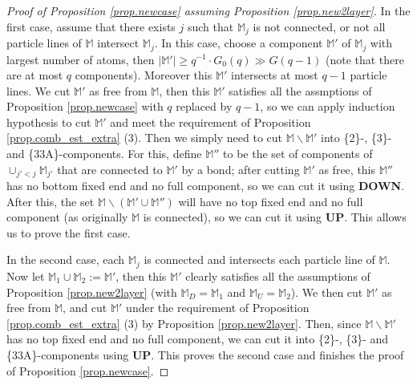 \documentclass[10pt, reqno]{amsart}
\newcommand{\Mb}{\mathbb M}
\theoremstyle{definition}
\theoremstyle{remark}
\numberwithin{equation}{section}
\begin{document}
\begin{proof}[Proof of Proposition \ref{prop.newcase} assuming Proposition \ref{prop.new2layer}]
In the first case, assume that there exists $j$ such that $\Mb_j$ is not connected, or not all particle lines of $\Mb$ intersect $\Mb_j$. In this case, choose a component $\Mb'$ of $\Mb_j$ with largest number of atoms, then $|\Mb'|\geq q^{-1}\cdot G_0(q)\gg G(q-1)$ (note that there are at most $q$ components). Moreover this $\Mb'$ intersects at most $q-1$ particle lines. We cut $\Mb'$ as free from $\Mb$, then this $\Mb'$ satisfies all the assmptions of Proposition \ref{prop.newcase} with $q$ replaced by $q-1$, so we can apply induction hypothesis to cut $\Mb'$ and meet the requirement of Proposition \ref{prop.comb_est_extra} (3). Then we simply need to cut $\Mb\backslash \Mb'$ into \{2\}-, \{3\}- and \{33A\}-components. For this, define $\Mb''$ to be the set of components of $\cup_{j'<j}\Mb_{j'}$ that are connected to $\Mb'$ by a bond; after cutting $\Mb'$ as free, this $\Mb''$ has no bottom fixed end and no full component, so we can cut it using \textbf{DOWN}. After this, the set $\Mb\backslash (\Mb'\cup\Mb'')$ will have no top fixed end and no full component (as originally $\Mb$ is connected), so we can cut it using \textbf{UP}. This allows us to prove the first case.

In the second case, each $\Mb_j$ is connected and intersects each particle line of $\Mb$. Now let $\Mb_1\cup\Mb_2:=\Mb'$, then this $\Mb'$ clearly satisfies all the assumptions of Proposition \ref{prop.new2layer} (with $\Mb_D=\Mb_1$ and $\Mb_U=\Mb_2$). We then cut $\Mb'$ as free from $\Mb$, and cut $\Mb'$ under the requirement of Proposition \ref{prop.comb_est_extra} (3) by Proposition \ref{prop.new2layer}. Then, since $\Mb\backslash\Mb'$ has no top fixed end and no full component, we can cut it into \{2\}-, \{3\}- and \{33A\}-components using \textbf{UP}. This proves the second case and finishes the proof of Proposition \ref{prop.newcase}. 
\end{proof}
\end{document}
